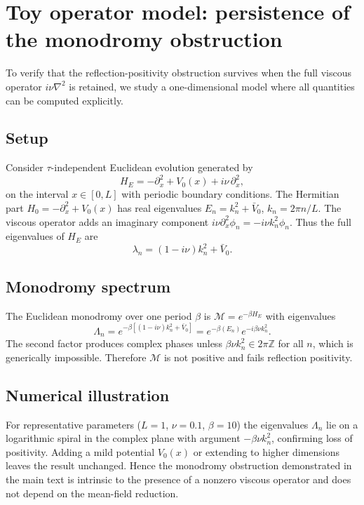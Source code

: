 \documentclass[11pt]{article}
\begin{document}
\section{Toy operator model: persistence of the monodromy obstruction}
\label{app:operator-toy}

To verify that the reflection-positivity obstruction survives when the full viscous operator $i\nu\nabla^2$ is retained, we study a one-dimensional model where all quantities can be computed explicitly.

\subsection*{Setup}
Consider $\tau$-independent Euclidean evolution generated by
\begin{equation}
    H_E = -\partial_x^2 + V_0(x) + i\nu\,\partial_x^2 ,
\end{equation}
on the interval $x\!\in\![0,L]$ with periodic boundary conditions.
The Hermitian part $H_0=-\partial_x^2+V_0(x)$ has real eigenvalues 
$E_n = k_n^2 + \bar V_0$, 
$k_n = 2\pi n/L$.
The viscous operator adds an imaginary component 
$i\nu\partial_x^2 \phi_n = -i\nu k_n^2 \phi_n$.
Thus the full eigenvalues of $H_E$ are
\begin{equation}
    \lambda_n = (1 - i\nu)k_n^2 + \bar V_0 .
\end{equation}

\subsection*{Monodromy spectrum}
The Euclidean monodromy over one period $\beta$ is $\mathcal M = e^{-\beta H_E}$ with eigenvalues
\[
    \Lambda_n = e^{-\beta[(1 - i\nu)k_n^2 + \bar V_0]} 
              = e^{-\beta(E_n)} e^{-i\beta\nu k_n^2}.
\]
The second factor produces complex phases unless $\beta\nu k_n^2\in2\pi\mathbb Z$ for all $n$, which is generically impossible.  Therefore $\mathcal M$ is not positive and fails reflection positivity.  

\subsection*{Numerical illustration}
For representative parameters ($L\!=\!1$, $\nu\!=\!0.1$, $\beta\!=\!10$) the eigenvalues $\Lambda_n$ lie on a logarithmic spiral in the complex plane with argument $-\beta\nu k_n^2$, confirming loss of positivity.  
Adding a mild potential $V_0(x)$ or extending to higher dimensions leaves the result unchanged.  
Hence the monodromy obstruction demonstrated in the main text is intrinsic to the presence of a nonzero viscous operator and does not depend on the mean-field reduction.
\end{document}

